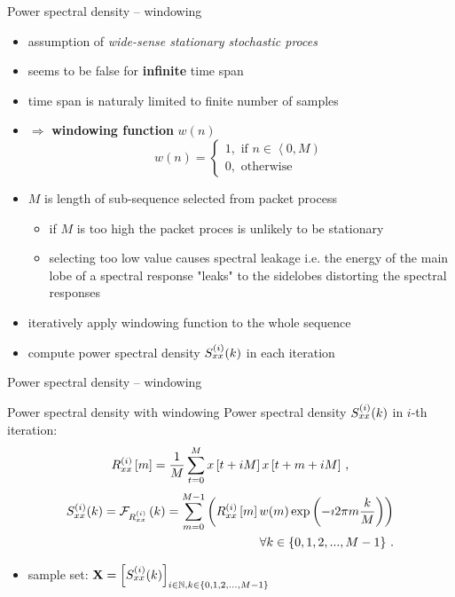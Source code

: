 \documentclass{beamer}
\begin{document}
\begin{frame}{Power spectral density -- windowing}
\begin{itemize}
	\item<1-7|only@1-7> assumption of \emph{wide-sense stationary stochastic proces}
	\item<2-8|only@1-8> seems to be false for \textbf{infinite} time span
	\item<3-9|only@1-9> time span is naturaly limited to finite number of samples
	\item<4-> $\Rightarrow$ \textbf{windowing function} $w(n)$
\begin{equation}
w(n) = \left\lbrace \begin{array}{l} 
1, \mbox{ if } n\in \left\langle 0, M \right) \\ 
0, \mbox{ otherwise} \end{array}\right. \,
\end{equation}
	\item<5->  $M$ is length of sub-sequence selected from packet process
	\begin{itemize}
		\item<6-> if $M$ is too high the packet proces is unlikely to be stationary
		\item<7-> selecting too low value causes spectral leakage i.e. the energy 
of the main lobe of a spectral response "leaks" to the sidelobes distorting the 
spectral responses
	\end{itemize}
	\item<8-> iteratively apply windowing function to the whole sequence
	\item<9-> compute power spectral density $S_{xx}^{\left({ i }\right)}{\left({ k }\right)}$ in each iteration 
\end{itemize}
\end{frame}


\begin{frame}{Power spectral density -- windowing}
\begin{block}{Power spectral density with windowing}
Power spectral density $S_{xx}^{\left({ i }\right)}{\left({ k }\right)}$ in $i$-th iteration:
\begin{equation}\label{eq:corr2}
R_{xx}^{\left({ i }\right)}\left[m\right] = \frac{1}{M} \sum_{t=0}^{M}
 x\left[t+iM\right]x\left[t+m+iM\right] \, , 
\end{equation}
\begin{equation}\label{eq:psd2}
\begin{split}
S_{xx}^{\left({ i }\right)}(k) = \mathcal{F}_{R_{xx}^{\left({ i }\right)}}\left(k\right) = \sum_{m=0}^{M-1}
\left( R_{xx}^{\left({ i }\right)} \left[m\right] w(m) \exp\left( -\imath 2\pi m\frac{k}{M} \right)\right)\\
\forall k \in \left\{ 0,1,2,...,M-1 \right\}\, . 
\end{split}
\end{equation}
\end{block}
\begin{itemize}
\item<2> sample set: $\mathbf{X} = {\left[{ S_{xx}^{\left({ i }\right)}{\left({ k }\right)} }\right]}_{i\in \mathbb{N},k \in \left\{ 0,1,2,...,M-1 \right\}}$
\end{itemize}
\end{frame}
\end{document}
